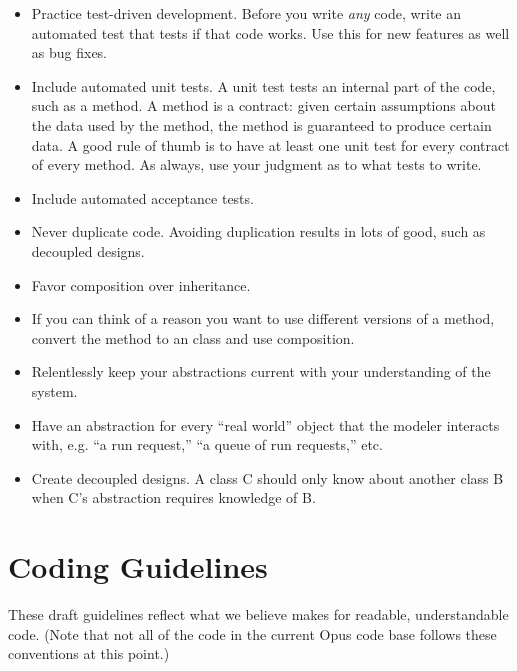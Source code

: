 \begin{itemize}

\item Practice test-driven development.  Before you write
{\em any} code, write an automated test that tests if that code works.
Use this for new features as well as bug fixes.

\item
Include automated unit tests.  A unit test tests an internal part
of the code, such as a method. A method is a contract: given
certain assumptions about the data used by the method, the method
is guaranteed to produce certain data.  A good rule of thumb is to
have at least one unit test for every contract of every method. As
always, use your judgment as to what tests to write.

\item Include automated acceptance tests.


\item Never duplicate code.  Avoiding duplication results in lots of good, such
as decoupled designs.

\item Favor composition over inheritance.

\item If you can think of a reason you want to use different
versions of a method, convert the method to an class and use
composition.

\item Relentlessly keep your abstractions current with your
understanding of the system.

\item Have an abstraction for every ``real world'' object that the modeler
interacts with, e.g. ``a run request,'' ``a queue of run requests,'' etc.

\item Create decoupled designs.  A class C should only know about another
class B when C's abstraction requires knowledge of B.

\end{itemize}

\section{Coding Guidelines}
\label{coding-guidelines}

These draft guidelines reflect what we believe makes for readable,
understandable code.  (Note that not all of the code in the current Opus
code base follows these conventions at this point.)

